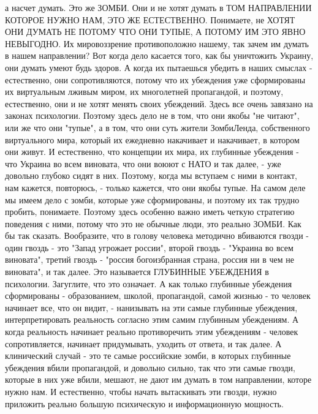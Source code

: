 а насчет думать. Это же ЗОМБИ. Они и не хотят думать в ТОМ НАПРАВЛЕНИИ КОТОРОЕ
НУЖНО НАМ, ЭТО ЖЕ ЕСТЕСТВЕННО. Понимаете, не ХОТЯТ ОНИ ДУМАТЬ НЕ ПОТОМУ ЧТО ОНИ
ТУПЫЕ, А ПОТОМУ ИМ ЭТО ЯВНО НЕВЫГОДНО. Их мировоззрение противоположно нашему,
так зачем им думать в нашем направлении? Вот когда дело касается того, как бы
уничтожить Украину, они думать умеют будь здоров. А когда их пытаешься убедить
в наших смыслах - естественно, они сопротивляются, потому что их убеждения уже
сформированы их виртуальным лживым миром, их многолетней пропагандой, и
поэтому, естественно, они и не хотят менять своих убеждений. Здесь все очень
завязано на законах психологии. Поэтому здесь дело не в том, что они якобы "не
читают", или же что они "тупые", а в том, что они суть жители ЗомбиЛенда,
собственного виртуального мира, который их ежедневно накачивает и накачивает, в
котором они живут. И естественно, что концепции их мира, их глубинные убеждения
- что Украина во всем виновата, что они воюют с НАТО и так далее, - уже
довольно глубоко сидят в них. Поэтому, когда мы вступаем с ними в контакт, нам
кажется, повторюсь, - только кажется, что они якобы тупые. На самом деле мы
имеем дело с зомби, которые уже сформированы, и поэтому их так трудно пробить,
понимаете. Поэтому здесь особенно важно иметь четкую стратегию поведения с
ними, потому что это не обычные люди, это реально ЗОМБИ. Как бы так сказать.
Вообразите, что в голову человека методично вбиваются гвозди - один гвоздь -
это "Запад угрожает россии", второй гвоздь - "Украина во всем виновата", третий
гвоздь - "россия богоизбранная страна, россия ни в чем не виновата", и так
далее. Это называется ГЛУБИННЫЕ УБЕЖДЕНИЯ в психологии. Загуглите, что это
означает. А как только глубинные убеждения сформированы - образованием, школой,
пропагандой, самой жизнью - то человек начинает все, что он видит, - нанизывать
на эти самые глубинные убеждения, интерпретировать реальность согласно этим
самим глубинным убеждениям. А когда реальность начинает реально противоречить
этим убеждениям - человек сопротивляется, начинает придумывать, уходить от
ответа, и так далее. А клинический случай - это те самые российские зомби, в
которых глубинные убеждения вбили пропагандой, и довольно сильно, так что эти
самые гвозди, которые в них уже вбили, мешают, не дают им думать в том
направлении, которе нужно нам. И естественно, чтобы начать вытаскивать эти
гвозди, нужно приложить реально большую психическую и информационную мощность.

